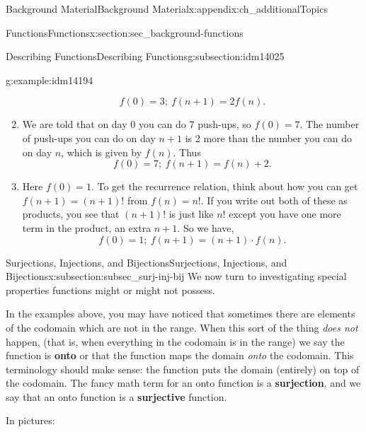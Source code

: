 \documentclass[oneside,10pt,]{book}
\newcommand{\terminology}[1]{\textbf{#1}}
\numberwithin{equation}{chapter}
\begin{document}
\begin{appendixptx}{Background Material}{}{Background Material}{}{}{x:appendix:ch_additionalTopics}
\begin{sectionptx}{Functions}{}{Functions}{}{}{x:section:sec_background-functions}
\begin{subsectionptx}{Describing Functions}{}{Describing Functions}{}{}{g:subsection:idm14025}
\begin{example}{}{g:example:idm14194}
\begin{enumerate}
\begin{equation*}
f(0) = 3;~ f(n+1) = 2f(n).
\end{equation*}
%
\item{}We are told that on day 0 you can do 7 push-ups, so \(f(0) = 7\).  The number of push-ups you can do on day \(n+1\) is 2 more than the number you can do on day \(n\), which is given by \(f(n)\).  Thus%
\begin{equation*}
f(0) = 7;~ f(n+1) = f(n) + 2.
\end{equation*}
%
\item{}Here \(f(0) = 1\).  To get the recurrence relation, think about how you can get \(f(n+1) = (n+1)!\) from \(f(n) = n!\).  If you write out both of these as products, you see that \((n+1)!\) is just like \(n!\) except you have one more term in the product, an extra \(n+1\).  So we have,%
\begin{equation*}
f(0) = 1;~ f(n+1) = (n+1)\cdot f(n).
\end{equation*}
%
\end{enumerate}
%
\end{example}
\end{subsectionptx}
%
%
\typeout{************************************************}
\typeout{************************************************}
%
\begin{subsectionptx}{Surjections, Injections, and Bijections}{}{Surjections, Injections, and Bijections}{}{}{x:subsection:subsec_surj-inj-bij}
We now turn to investigating special properties functions might or might not possess.%
\par
In the examples above, you may have noticed that sometimes there are elements of the codomain which are not in the range. When this sort of the thing \emph{does not} happen, (that is, when everything in the codomain is in the range) we say the function is \terminology{onto} or that the function maps the domain \emph{onto} the codomain. This terminology should make sense: the function puts the domain (entirely) on top of the codomain. The fancy math term for an onto function is a \terminology{surjection}, and we say that an onto function is a \terminology{surjective} function.%
\par
In pictures:%
\begin{sidebyside}{2}{0.1}{0.1}{0.2}%
\begin{sbspanel}{0.3}%
\resizebox{\linewidth}{!}{%
  \begin{tikzpicture}

\end{tikzpicture}}
\end{sbspanel}
\end{sidebyside}
\end{subsectionptx}
\end{sectionptx}
\end{appendixptx}
\end{document}
